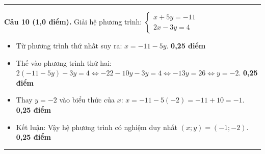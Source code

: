 \documentclass[12pt,a4paper]{article}
\begin{document}
\vspace{2mm}
\hrule
\vspace{2mm}

\noindent\textbf{Câu 10 (1,0 điểm).} Giải hệ phương trình: $\begin{cases} x + 5y = -11 \\ 2x - 3y = 4 \end{cases}$
\begin{itemize}[leftmargin=16pt, itemsep=1.5pt, parsep=0pt]
  \item Từ phương trình thứ nhất suy ra: $x = -11 - 5y$. \dotfill \textbf{0,25 điểm}
  \item Thế vào phương trình thứ hai:
  $2(-11 - 5y) - 3y = 4 \iff -22 - 10y - 3y = 4 \iff -13y = 26 \iff y = -2$. \dotfill \textbf{0,25 điểm}
  \item Thay $y = -2$ vào biểu thức của $x$: $x = -11 - 5(-2) = -11 + 10 = -1$. \dotfill \textbf{0,25 điểm}
  \item Kết luận: Vậy hệ phương trình có nghiệm duy nhất $(x; y) = (-1; -2)$. \dotfill \textbf{0,25 điểm}
\end{itemize}

\vspace{2mm}
\hrule
\vspace{2mm}
\end{document}
